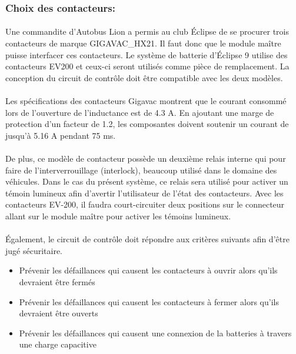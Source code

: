 	\subsubsection*{Choix des contacteurs:}
		\paragraph*{}
		Une commandite d'Autobus Lion a permis au club Éclipse de se procurer trois contacteurs de marque GIGAVAC\_HX21. Il faut donc que le module maître puisse interfacer ces contacteurs. Le système de batterie d'Éclipse 9 utilise des contacteurs EV200 et ceux-ci seront utilisés comme pièce de remplacement. La conception du circuit de contrôle doit être compatible avec les deux modèles.

		\paragraph*{}
		Les spécifications des contacteurs Gigavac montrent que le courant consommé lors de l'ouverture de l'inductance est de 4.3 A. En ajoutant une marge de protection d'un facteur de 1.2, les composantes doivent soutenir un courant de jusqu'à 5.16 A pendant 75 ms\cite{GigavacHX21}. 

		\paragraph*{}
		De plus, ce modèle de contacteur possède un deuxième relais interne qui pour faire de l'interverrouillage (interlock), beaucoup utilisé dans le domaine des véhicules. Dans le cas du présent système, ce relais sera utilisé pour activer un témoin lumineux afin d'avertir l'utilisateur de l'état des contacteurs. Avec les contacteurs EV-200, il faudra court-circuiter deux positions sur le connecteur allant sur le module maître pour activer les témoins lumineux.

		\paragraph*{}
		Également, le circuit de contrôle doit répondre aux critères suivants afin d'être jugé sécuritaire\cite{System_Approach}. 

		\begin{itemize}
			\item Prévenir les défaillances qui causent les contacteurs à ouvrir alors qu'ils devraient être fermés
			\item Prévenir les défaillances qui causent les contacteurs à fermer alors qu'ils devraient être ouverts
			\item Prévenir les défaillances qui causent une connexion de la batteries à travers une charge capacitive	
		\end{itemize}


